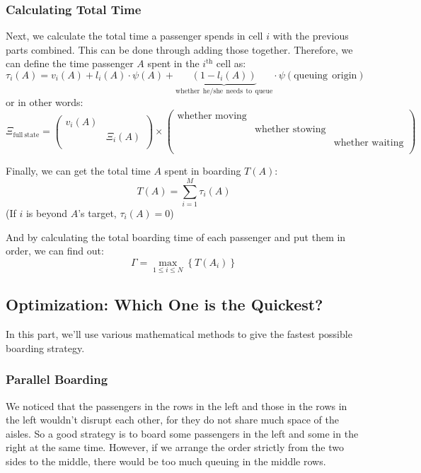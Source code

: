 \documentclass{article}
\theoremstyle{definition}
\theoremstyle{remark}
\numberwithin{equation}{section}
\begin{document}
	\subsubsection{Calculating Total Time}
	Next, we calculate the total time a passenger spends in cell \(i\) with the previous parts combined. This can be done through adding those together. Therefore, we can define the time passenger $A$ spent in the $i^\text{th}$ cell as:
	$$\tau _i\left( A \right) =v_i\left( A \right) +l_i\left( A \right) \cdot \psi \left( A \right) +\underset{\mathrm{whether}\:\:\mathrm{he}/\mathrm{she}\:\:\mathrm{needs}\:\:\mathrm{to}\:\:\mathrm{queue}}{\underbrace{\left( 1-l_i\left( A \right) \right) }}\cdot \psi \left( \mathrm{queuing}\:\:\mathrm{origin} \right)$$
	or in other words:
	\[\Xi _{\mathrm{full}\:\mathrm{state}}=\left( \begin{matrix}
	v_i\left( A \right)&		\\
	&		\Xi _i\left( A \right)\\
	\end{matrix} \right) \times \left( \begin{matrix}
	\text{whether moving}&		&		\\
	&		\text{whether stowing}&		\\
	&		&		\text{whether waiting}\\
	\end{matrix} \right) \]

	Finally, we can get the total time $A$ spent in boarding $T(A)$:
	$$T\left( A \right) =\sum_{i=1}^M{\tau _i\left( A \right)}$$
	(If $i$ is beyond \(A\)'s target, $\tau_i(A)=0$)

	And by calculating the total boarding time of each passenger and put them in order, we can find out:
	$$\Gamma =\max_{1\le i\le N} \left\{ T\left( A_i \right) \right\}$$
	\subsection{Optimization: Which One is the Quickest?}
	In this part, we'll use various mathematical methods to give the fastest possible boarding strategy.
	\subsubsection{Parallel Boarding}
	We noticed that the passengers in the rows in the left and those in the rows in the left wouldn't disrupt each other, for they do not share much space of the aisles. So a good strategy is to board some passengers in the left and some in the right at the same time. However, if we arrange the order strictly from the two sides to the middle, there would be too much queuing in the middle rows.
\end{document}
